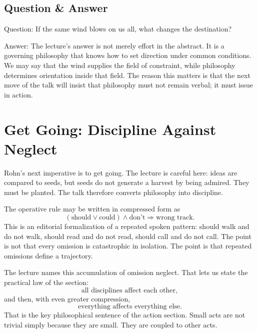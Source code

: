 \subsection{Question \& Answer}

Question: If the same wind blows on us all, what changes the destination?

Answer: The lecture's answer is not merely effort in the abstract. It is a governing philosophy that knows how to set direction under common conditions. We may say that the wind supplies the field of constraint, while philosophy determines orientation inside that field. The reason this matters is that the next move of the talk will insist that philosophy must not remain verbal; it must issue in action.

\section{Get Going: Discipline Against Neglect}

Rohn's next imperative is to get going. The lecture is careful here: ideas are compared to seeds, but seeds do not generate a harvest by being admired. They must be planted. The talk therefore converts philosophy into discipline.

The operative rule may be written in compressed form as
\begin{equation}
(\text{should} \lor \text{could}) \land \text{don't} \Rightarrow \text{wrong track}.
\end{equation}
This is an editorial formalization of a repeated spoken pattern: should walk and do not walk, should read and do not read, should call and do not call. The point is not that every omission is catastrophic in isolation. The point is that repeated omissions define a trajectory.

The lecture names this accumulation of omission neglect. That lets us state the practical law of the section:
\begin{equation}
\text{all disciplines affect each other},
\end{equation}
and then, with even greater compression,
\begin{equation}
\text{everything affects everything else}.
\end{equation}
That is the key philosophical sentence of the action section. Small acts are not trivial simply because they are small. They are coupled to other acts.

